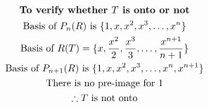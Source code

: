 \documentclass[english,course,fleqn]{lecture}
\newenvironment{qanda}{\setlength{\parindent}{0pt}}{\bigskip}
\begin{document}
\begin{qanda}
  \begin{gather*}
    \text{\textbf{To verify whether $T$ is onto or not}}\\
    \text{Basis of $P_{n}(R)$ is } \{1, x, x^{2}, x^{3}, \ldots, x^{n}\}\\
   \text{Basis of $R(T)$} = \{x, \frac{x^{2}}{2}, \frac{x^{3}}{3}, \ldots, \frac{x^{n+1}}{n+1}\}\\
    \text{Basis of $P_{n+1}(R)$ is } \{1, x, x^{2}, x^{3}, \ldots, x^{n}, x^{n+1}\}\\
    \text{There is no pre-image for 1}\\
    \therefore \text{$T$ is not onto}
  \end{gather*}

\end{qanda}
\end{document}
